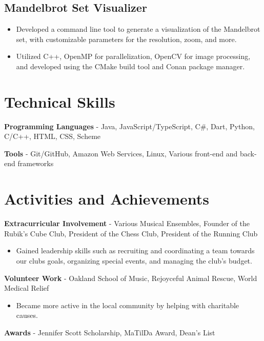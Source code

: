 \documentclass{article}
\newcommand{\resumesection}[1]{
	\section*{\Large\textbf{#1}}
	\hrulefill
	\vspace{1ex}
}
\begin{document}
\subsection*{Mandelbrot Set Visualizer}

\begin{itemize}
	\item Developed a command line tool to generate a visualization of the Mandelbrot set, with customizable parameters for the resolution, zoom, and more.
	\item Utilized C++, OpenMP for parallelization, OpenCV for image processing, and developed using the CMake build tool and Conan package manager.
\end{itemize}


\resumesection{Technical Skills}

\vspace{.2ex}

\textbf{Programming Languages} -  Java, JavaScript/TypeScript, C\#, Dart, Python, C/C++, HTML, CSS, Scheme

\textbf{Tools} - Git/GitHub, Amazon Web Services, Linux, Various front-end and back-end frameworks %

\vspace{.5ex}


\resumesection{Activities and Achievements}

\vspace{.2ex}

\textbf {Extracurricular Involvement} - Various Musical Ensembles, Founder of the Rubik's Cube Club, President of the Chess Club, President of the Running Club


	\begin{itemize}
		\item Gained leadership skills such as recruiting and coordinating a team towards our clubs goals, organizing special events, and managing the club's budget.
	\end{itemize}

\textbf {Volunteer Work} - Oakland School of Music, Rejoyceful Animal Rescue, World Medical Relief

	\begin{itemize}
		\item Became more active in the local community by helping with charitable causes.
	\end{itemize}

\textbf {Awards} - Jennifer Scott Scholarship, MaTilDa Award, Dean's List
\end{document}
